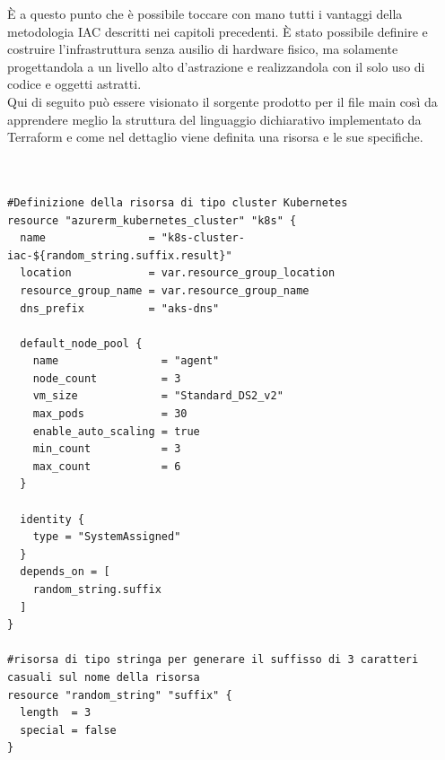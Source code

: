 \documentclass[a4paper,12pt]{report}
\begin{document}
È a questo punto che è possibile toccare con mano tutti i vantaggi della metodologia IAC descritti nei capitoli precedenti. È stato possibile definire e costruire l'infrastruttura senza ausilio di hardware fisico, ma solamente progettandola a un livello alto d'astrazione e realizzandola con il solo uso di codice e oggetti astratti.\\
Qui di seguito può essere visionato il sorgente prodotto per il file main così da apprendere meglio la struttura del linguaggio dichiarativo implementato da Terraform e come nel dettaglio viene definita una risorsa e le sue specifiche.\\ \\ \\ 
\begin{lstlisting}[caption={\\\textit{Codice sorgente all'interno del file main.tf prodotto.\\ }}]
#Definizione della risorsa di tipo cluster Kubernetes
resource "azurerm_kubernetes_cluster" "k8s" {
  name                = "k8s-cluster-iac-${random_string.suffix.result}"
  location            = var.resource_group_location
  resource_group_name = var.resource_group_name
  dns_prefix          = "aks-dns"

  default_node_pool {
    name                = "agent"
    node_count          = 3
    vm_size             = "Standard_DS2_v2"
    max_pods            = 30
    enable_auto_scaling = true
    min_count           = 3
    max_count           = 6
  }

  identity {
    type = "SystemAssigned"
  }
  depends_on = [
    random_string.suffix
  ]
}

#risorsa di tipo stringa per generare il suffisso di 3 caratteri casuali sul nome della risorsa
resource "random_string" "suffix" {
  length  = 3
  special = false
} 
\end{lstlisting}
\end{document}
